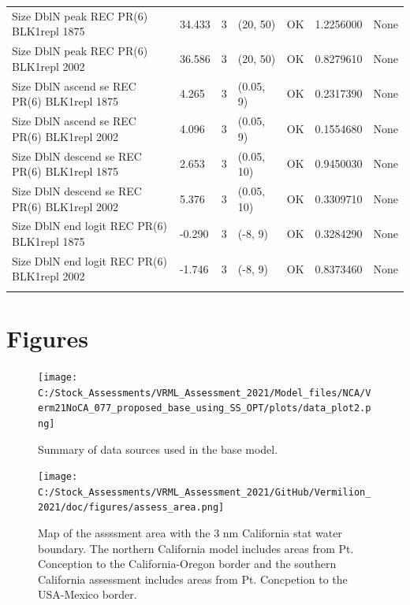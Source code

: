 \documentclass[11pt,
  english,
  a4paper,
]{article}
\begin{document}
\begin{landscape}
\begin{longtable}[t]{>{\raggedright\arraybackslash}p{8.5cm}lllll>{\raggedright\arraybackslash}p{4cm}}
Size DblN peak REC PR(6) BLK1repl 1875 & 34.433 & 3 & (20, 50) & OK & 1.2256000 & None\\
Size DblN peak REC PR(6) BLK1repl 2002 & 36.586 & 3 & (20, 50) & OK & 0.8279610 & None\\
Size DblN ascend se REC PR(6) BLK1repl 1875 & 4.265 & 3 & (0.05, 9) & OK & 0.2317390 & None\\
Size DblN ascend se REC PR(6) BLK1repl 2002 & 4.096 & 3 & (0.05, 9) & OK & 0.1554680 & None\\
Size DblN descend se REC PR(6) BLK1repl 1875 & 2.653 & 3 & (0.05, 10) & OK & 0.9450030 & None\\
Size DblN descend se REC PR(6) BLK1repl 2002 & 5.376 & 3 & (0.05, 10) & OK & 0.3309710 & None\\
Size DblN end logit REC PR(6) BLK1repl 1875 & -0.290 & 3 & (-8, 9) & OK & 0.3284290 & None\\
Size DblN end logit REC PR(6) BLK1repl 2002 & -1.746 & 3 & (-8, 9) & OK & 0.8373460 & None\\*
\end{longtable}
\leavevmode\tagmcend\tagstructend\par
\endgroup{}
\end{landscape}
\endgroup{}

\clearpage


\hypertarget{figures}{%
\section{Figures}\label{figures}}

\leavevmode\tagmcend\tagstructend

\begin{figure}
\centering
\texttt{[image: C:/Stock\_Assessments/VRML\_Assessment\_2021/Model\_files/NCA/Verm21NoCA\_077\_proposed\_base\_using\_SS\_OPT/plots/data\_plot2.png]}
\caption{Summary of data sources used in the base model.\label{fig:data-plot}}
\end{figure}

\begin{figure}
\centering
\texttt{[image: C:/Stock\_Assessments/VRML\_Assessment\_2021/GitHub/Vermilion\_2021/doc/figures/assess\_area.png]}
\caption{Map of the assssment area with the 3 nm California stat water boundary. The northern California model includes areas from Pt. Conception to the California-Oregon border and the southern California assessment includes areas from Pt. Concpetion to the USA-Mexico border.\label{fig:assess-area}}
\end{figure}
\end{document}

